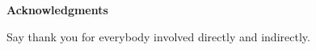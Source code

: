 
\newpage
\vspace*{0.9cm}
\begin{center}
{\bf \Huge Acknowledgments}
\end{center}

\setlength{\baselineskip}{0.8cm}



Say thank you for everybody involved directly and indirectly.

